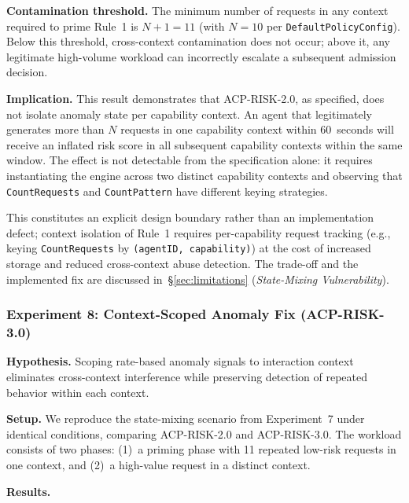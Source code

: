 \documentclass[11pt]{article}
\theoremstyle{definition}
\begin{document}
\textbf{Contamination threshold.}
The minimum number of requests in any context required to prime Rule~1 is
$N + 1 = 11$ (with $N = 10$ per \texttt{DefaultPolicyConfig}). Below this
threshold, cross-context contamination does not occur; above it, any legitimate
high-volume workload can incorrectly escalate a subsequent admission decision.

\textbf{Implication.}
This result demonstrates that ACP-RISK-2.0, as specified, does not isolate
anomaly state per capability context. An agent that legitimately generates more
than $N$ requests in one capability context within 60~seconds will receive an
inflated risk score in all subsequent capability contexts within the same window.
The effect is not detectable from the specification alone: it requires
instantiating the engine across two distinct capability contexts and observing
that \texttt{CountRequests} and \texttt{CountPattern} have different keying
strategies.

This constitutes an explicit design boundary rather than an implementation
defect; context isolation of Rule~1 requires per-capability request tracking
(e.g., keying \texttt{CountRequests} by \texttt{(agentID, capability)}) at the
cost of increased storage and reduced cross-context abuse detection.
The trade-off and the implemented fix are discussed in~\S\ref{sec:limitations}
(\emph{State-Mixing Vulnerability}).

\subsubsection*{Experiment 8: Context-Scoped Anomaly Fix (ACP-RISK-3.0)}
\label{sec:exp8}

\textbf{Hypothesis.}
Scoping rate-based anomaly signals to interaction context eliminates
cross-context interference while preserving detection of repeated behavior
within each context.

\textbf{Setup.}
We reproduce the state-mixing scenario from Experiment~7 under identical
conditions, comparing ACP-RISK-2.0 and ACP-RISK-3.0\@. The workload consists
of two phases: (1)~a priming phase with 11 repeated low-risk requests in one
context, and (2)~a high-value request in a distinct context.

\textbf{Results.}
\end{document}
